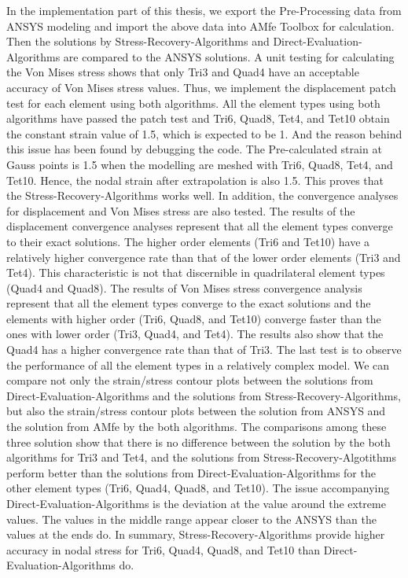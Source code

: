 In the implementation part of this thesis, we export the Pre-Processing data from ANSYS modeling and import the above data into AMfe Toolbox for calculation. Then the solutions by Stress-Recovery-Algorithms and Direct-Evaluation-Algorithms are compared to the ANSYS solutions. A unit testing for calculating the Von Mises stress shows that only Tri3 and Quad4 have an acceptable accuracy of Von Mises stress values. Thus, we implement the displacement patch test for each element using both algorithms. All the element types using both algorithms have passed the patch test and Tri6, Quad8, Tet4, and Tet10 obtain the constant strain value of 1.5, which is expected to be 1. And the reason behind this issue has been found by debugging the code. The Pre-calculated strain at Gauss points is 1.5 when the modelling are meshed with Tri6, Quad8, Tet4, and Tet10. Hence, the nodal strain after extrapolation is also 1.5. This proves that the Stress-Recovery-Algorithms works well. In addition, the convergence analyses for displacement and Von Mises stress are also tested. The results of the displacement convergence analyses represent that all the element types converge to their exact solutions. The higher order elements (Tri6 and Tet10) have a relatively higher convergence rate than that of the lower order elements (Tri3 and Tet4). This characteristic is not that discernible in quadrilateral element types (Quad4 and Quad8). The results of Von Mises stress convergence analysis represent that all the element types converge to the exact solutions and the elements with higher order (Tri6, Quad8, and Tet10) converge faster than the ones with lower order (Tri3, Quad4, and Tet4). The results also show that the Quad4 has a higher convergence rate than that of Tri3. The last test is to observe the performance of all the element types in a relatively complex model. We can compare not only the strain/stress contour plots between the solutions from Direct-Evaluation-Algorithms and the solutions from Stress-Recovery-Algorithms, but also the strain/stress contour plots between the solution from ANSYS and the solution from AMfe by the both algorithms. The comparisons among these three solution show that there is no difference between the solution by the both algorithms for Tri3 and Tet4, and the solutions from Stress-Recovery-Algotithms perform better than the solutions from Direct-Evaluation-Algorithms for the other element types (Tri6, Quad4, Quad8, and Tet10). The issue accompanying Direct-Evaluation-Algorithms is the deviation at the value around the extreme values. The values in the middle range appear closer to the ANSYS than the values at the ends do. In summary, Stress-Recovery-Algorithms provide higher accuracy in nodal stress for Tri6, Quad4, Quad8, and Tet10 than Direct-Evaluation-Algorithms do.  



